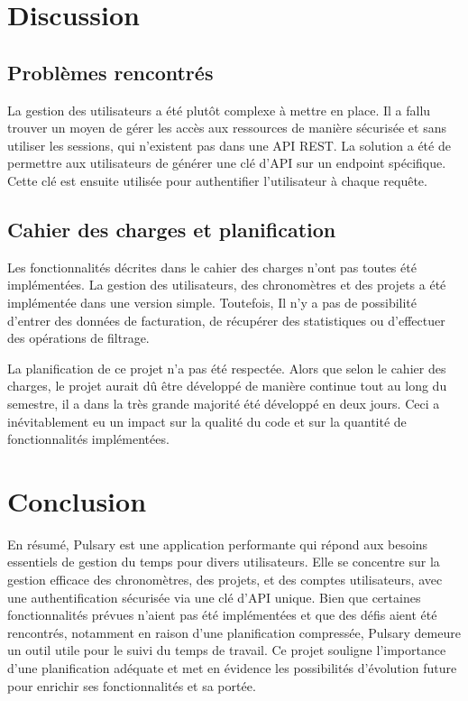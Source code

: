 \documentclass[
  french,
  a4paper,
]{scrartcl}
\begin{document}
\section{Discussion}

\subsection{Problèmes rencontrés}

La gestion des utilisateurs a été plutôt complexe à mettre en place. 
Il a fallu trouver un moyen de gérer les accès aux ressources de manière 
sécurisée et sans utiliser les sessions, qui n'existent pas dans une API REST. 
La solution a été de permettre aux utilisateurs de générer une clé d'API
sur un endpoint spécifique. Cette clé est ensuite utilisée pour authentifier
l'utilisateur à chaque requête. 


\subsection{Cahier des charges et planification}

Les fonctionnalités décrites dans le cahier des charges n'ont pas 
toutes été implémentées. La gestion des utilisateurs, des chronomètres 
et des projets a été implémentée dans une version simple. Toutefois, 
Il n'y a pas de possibilité d'entrer des données de facturation, 
de récupérer des statistiques ou d'effectuer des opérations de filtrage. 

La planification de ce projet n'a pas été respectée. Alors que selon 
le cahier des charges, le projet aurait dû être développé de manière 
continue tout au long du semestre, il a dans la très grande majorité 
été développé en deux jours. Ceci a inévitablement eu un impact sur
la qualité du code et sur la quantité de fonctionnalités implémentées.

\section{Conclusion}


En résumé, Pulsary est une application performante qui répond 
aux besoins essentiels de gestion du temps pour divers utilisateurs. 
Elle se concentre sur la gestion efficace des chronomètres, des projets, 
et des comptes utilisateurs, avec une authentification sécurisée via une 
clé d'API unique. Bien que certaines fonctionnalités prévues n'aient pas 
été implémentées et que des défis aient été rencontrés, notamment en raison 
d'une planification compressée, Pulsary demeure un outil utile pour le suivi 
du temps de travail. Ce projet souligne l'importance d'une planification 
adéquate et met en évidence les possibilités d'évolution future pour 
enrichir ses fonctionnalités et sa portée.
\end{document}
